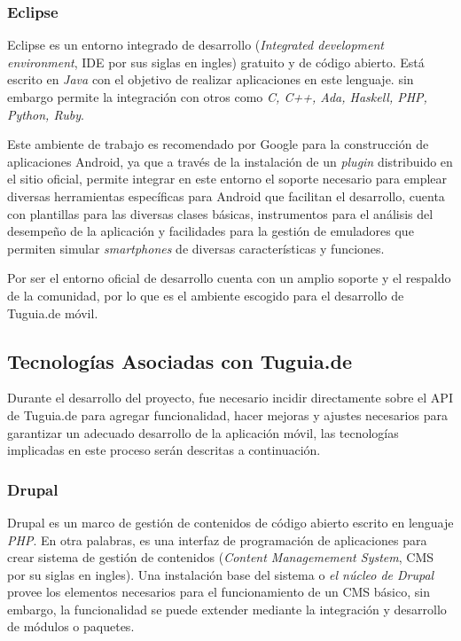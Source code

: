 \subsubsection{Eclipse}

Eclipse es un entorno integrado de desarrollo (\textit{Integrated development environment}, IDE por sus siglas en ingles) gratuito y de código abierto. Está escrito en \textit{Java} con el objetivo de realizar aplicaciones en este lenguaje. sin embargo permite la integración con otros como \textit{C, C++, Ada, Haskell, PHP, Python, Ruby}.

Este ambiente de trabajo es recomendado por Google para la construcción de aplicaciones Android, ya que a través de la instalación de un \textit{plugin} distribuido en el sitio oficial, permite integrar en este entorno el soporte necesario para emplear diversas herramientas específicas para Android que facilitan el desarrollo, cuenta con plantillas para las diversas clases básicas, instrumentos para el análisis del desempeño de la aplicación y facilidades para la gestión de emuladores que permiten simular \textit{smartphones} de diversas características y funciones.

Por ser el entorno oficial de desarrollo cuenta con un amplio soporte y el respaldo de la comunidad, por lo que es el ambiente escogido para el desarrollo de Tuguia.de móvil.

\subsection{Tecnologías Asociadas con Tuguia.de} \label{subsect:Asociadas_movil}

Durante el desarrollo del proyecto, fue necesario incidir directamente sobre el API de Tuguia.de para agregar funcionalidad, hacer mejoras y ajustes necesarios para garantizar un adecuado desarrollo de la aplicación móvil, las tecnologías implicadas en este proceso serán descritas a continuación.

\subsubsection{Drupal}

Drupal es un marco de gestión de contenidos de código abierto escrito en lenguaje \textit{PHP}. En otra palabras, es una interfaz de programación de aplicaciones para crear sistema de gestión de contenidos (\textit{Content Managemement System}, CMS por su siglas en ingles). Una instalación base del sistema o \textit{el núcleo de Drupal} provee los elementos necesarios para el funcionamiento de un CMS básico, sin embargo, la funcionalidad se puede extender mediante la integración y desarrollo de módulos o paquetes\cite{TV10}.

